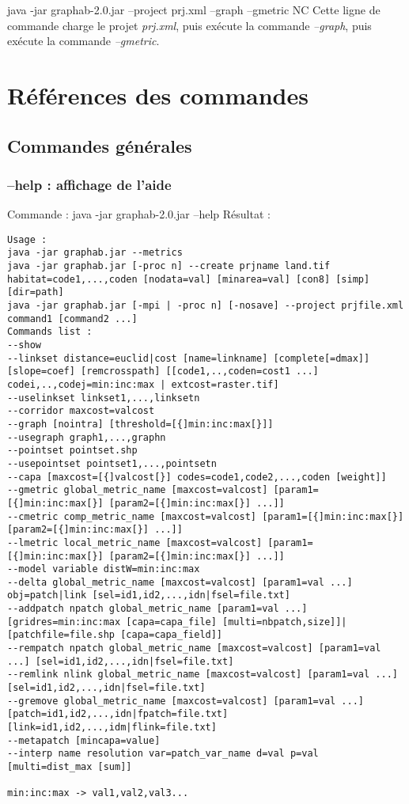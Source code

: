 \documentclass[a4paper,10pt]{report}
\newenvironment{cmd}
{\quote\Verbatim}
{\endVerbatim\endquote}
\begin{document}
\begin{cmd}
java -jar graphab-2.0.jar --project prj.xml --graph --gmetric NC  
\end{cmd}
Cette ligne de commande charge le projet \textit{prj.xml}, puis exécute la commande \textit{--graph}, puis exécute la commande \textit{--gmetric}.


\chapter{Références des commandes}
\section{Commandes générales}
\subsection{--help : affichage de l'aide}
Commande :
\begin{cmd}
java -jar graphab-2.0.jar --help
\end{cmd}
Résultat :
\begin{verbatim}
Usage :
java -jar graphab.jar --metrics
java -jar graphab.jar [-proc n] --create prjname land.tif habitat=code1,...,coden [nodata=val] [minarea=val] [con8] [simp] [dir=path]
java -jar graphab.jar [-mpi | -proc n] [-nosave] --project prjfile.xml command1 [command2 ...]
Commands list :
--show
--linkset distance=euclid|cost [name=linkname] [complete[=dmax]] [slope=coef] [remcrosspath] [[code1,..,coden=cost1 ...] codei,..,codej=min:inc:max | extcost=raster.tif]
--uselinkset linkset1,...,linksetn
--corridor maxcost=valcost
--graph [nointra] [threshold=[{]min:inc:max[}]]
--usegraph graph1,...,graphn
--pointset pointset.shp
--usepointset pointset1,...,pointsetn
--capa [maxcost=[{]valcost[}] codes=code1,code2,...,coden [weight]]
--gmetric global_metric_name [maxcost=valcost] [param1=[{]min:inc:max[}] [param2=[{]min:inc:max[}] ...]]
--cmetric comp_metric_name [maxcost=valcost] [param1=[{]min:inc:max[}] [param2=[{]min:inc:max[}] ...]]
--lmetric local_metric_name [maxcost=valcost] [param1=[{]min:inc:max[}] [param2=[{]min:inc:max[}] ...]]
--model variable distW=min:inc:max
--delta global_metric_name [maxcost=valcost] [param1=val ...] obj=patch|link [sel=id1,id2,...,idn|fsel=file.txt]
--addpatch npatch global_metric_name [param1=val ...] [gridres=min:inc:max [capa=capa_file] [multi=nbpatch,size]]|[patchfile=file.shp [capa=capa_field]]
--rempatch npatch global_metric_name [maxcost=valcost] [param1=val ...] [sel=id1,id2,...,idn|fsel=file.txt]
--remlink nlink global_metric_name [maxcost=valcost] [param1=val ...] [sel=id1,id2,...,idn|fsel=file.txt]
--gremove global_metric_name [maxcost=valcost] [param1=val ...] [patch=id1,id2,...,idn|fpatch=file.txt] [link=id1,id2,...,idm|flink=file.txt]
--metapatch [mincapa=value]
--interp name resolution var=patch_var_name d=val p=val [multi=dist_max [sum]]

min:inc:max -> val1,val2,val3...
\end{verbatim}
\end{document}
